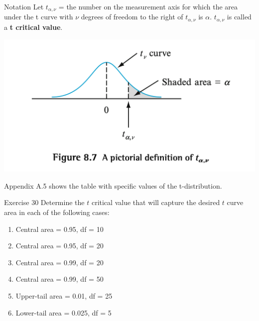 \documentclass[
  ignorenonframetext,
]{beamer}
\providecommand{\tightlist}{%
  \setlength{\itemsep}{0pt}\setlength{\parskip}{0pt}}\usepackage{longtable,booktabs,array}
\begin{document}
\begin{frame}{Notation}
\protect\hypertarget{notation}{}
Let \(t_{\alpha,\nu}\) = the number on the measurement axis for which
the area under the t curve with \(\nu\) degrees of freedom to the right
of \(t_{\alpha, \nu}\) is \(\alpha\). \(t_{\alpha,\nu}\) is called a
\textbf{t critical value}.

\includegraphics{images/criticalt.png}

Appendix A.5 shows the table with specific values of the t-distribution.
\end{frame}

\begin{frame}{Exercise 30}
\protect\hypertarget{exercise-30}{}
Determine the \(t\) critical value that will capture the desired \(t\)
curve area in each of the following cases:

\begin{enumerate}[<+->]
[a.]
\tightlist
\item
  Central area = 0.95, df = 10
\item
  Central area = 0.95, df = 20
\item
  Central area = 0.99, df = 20
\item
  Central area = 0.99, df = 50
\item
  Upper-tail area = 0.01, df = 25
\item
  Lower-tail area = 0.025, df = 5
\end{enumerate}
\end{frame}
\end{document}
